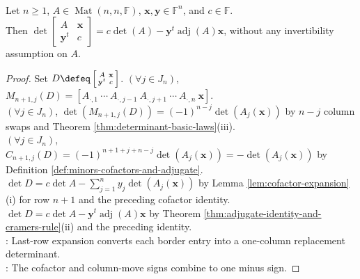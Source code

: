 \begin{proposition} \label{prop:bordered-determinant-adjugate-form} \\
Let $n\geq1$, $A\in\operatorname{Mat}(n,n,\mathbb{F})$, $\mathbf{x},\mathbf{y}\in\mathbb{F}^n$, and $c\in\mathbb{F}$.\\
Then $\det\left[\begin{smallmatrix}A&\mathbf{x}\\ \mathbf{y}^t&c\end{smallmatrix}\right]=c\det(A)-\mathbf{y}^t\operatorname{adj}(A)\mathbf{x}$, without any invertibility assumption on $A$.
\begin{proof}
Set $D\defeq\left[\begin{smallmatrix}A&\mathbf{x}\\ \mathbf{y}^t&c\end{smallmatrix}\right]$. $(\forall j\in J_n)$, $M_{n+1,j}(D)=\left[A_{\cdot,1}\ \cdots\ A_{\cdot,j-1}\ A_{\cdot,j+1}\ \cdots\ A_{\cdot,n}\ \mathbf{x}\right]$.\\
$(\forall j\in J_n)$, $\det(M_{n+1,j}(D))=(-1)^{n-j}\det(A_j(\mathbf{x}))$ by $n-j$ column swaps and Theorem \ref{thm:determinant-basic-laws}(iii).\\
$(\forall j\in J_n)$, $C_{n+1,j}(D)=(-1)^{n+1+j+n-j}\det(A_j(\mathbf{x}))=-\det(A_j(\mathbf{x}))$ by Definition \ref{def:minors-cofactors-and-adjugate}.\\
$\det D=c\det A-\sum\limits_{j=1}^{n}y_j\det(A_j(\mathbf{x}))$ by Lemma \ref{lem:cofactor-expansion}(i) for row $n+1$ and the preceding cofactor identity.\\
$\det D=c\det A-\mathbf{y}^t\operatorname{adj}(A)\mathbf{x}$ by Theorem \ref{thm:adjugate-identity-and-cramers-rule}(ii) and the preceding identity.\\
: Last-row expansion converts each border entry into a one-column replacement determinant.\\
: The cofactor and column-move signs combine to one minus sign.
\end{proof}
\end{proposition}

